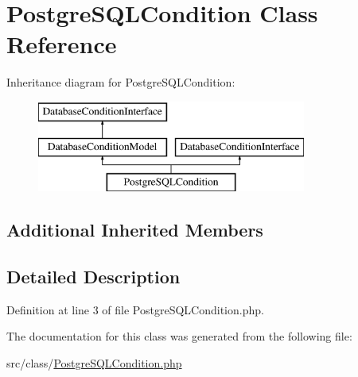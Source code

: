 \hypertarget{class_postgre_s_q_l_condition}{}\section{Postgre\+S\+Q\+L\+Condition Class Reference}
\label{class_postgre_s_q_l_condition}
Inheritance diagram for Postgre\+S\+Q\+L\+Condition\+:\begin{figure}[H]
\begin{center}
\leavevmode
\includegraphics[height=3.000000cm]{class_postgre_s_q_l_condition}
\end{center}
\end{figure}
\subsection*{Additional Inherited Members}


\subsection{Detailed Description}


Definition at line 3 of file Postgre\+S\+Q\+L\+Condition.\+php.



The documentation for this class was generated from the following file\+:\begin{DoxyCompactItemize}
\item 
src/class/\hyperlink{_postgre_s_q_l_condition_8php}{Postgre\+S\+Q\+L\+Condition.\+php}\end{DoxyCompactItemize}
